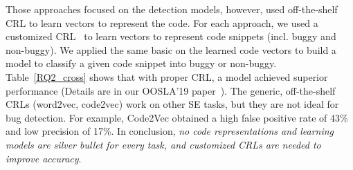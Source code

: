 
Those approaches focused on the detection models, however, used
off-the-shelf CRL to learn vectors to represent the code.  For each
approach, we used a customized CRL~\cite{yioopsla19} to learn vectors
to represent code snippets (incl. buggy and non-buggy).  We applied
the same basic \cnn on the learned code vectors to build a model to
classify a given code snippet into buggy or non-buggy.
Table~\ref{RQ2_cross} shows that with proper CRL, a model achieved
superior performance (Details are in our OOSLA'19
paper~\cite{yioopsla19}). The generic, off-the-shelf CRLs (word2vec,
code2vec) work on other SE tasks, but they are not ideal for bug
detection. For example, Code2Vec obtained a high false positive rate
of 43\% and low precision of 17\%.  In conclusion, {\em no code
  representations and learning models are silver bullet for every
  task, and customized CRLs are needed to improve accuracy}.




